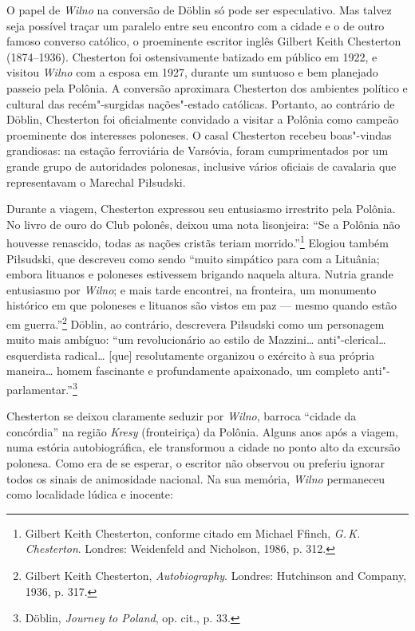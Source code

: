 %

O papel de \textit{Wilno} na conversão de Döblin só pode ser especulativo. Mas
talvez seja possível traçar um paralelo entre seu encontro com a cidade
e o de outro famoso converso católico, o proeminente escritor inglês
Gilbert Keith Chesterton (1874--1936). Chesterton foi ostensivamente
batizado em público em 1922, e visitou \textit{Wilno} com a esposa em 1927,
durante um suntuoso e bem planejado passeio pela Polônia. A conversão
aproximara Chesterton dos ambientes político e cultural das
recém"-surgidas nações"-estado católicas. Portanto, ao contrário de
Döblin, Chesterton foi oficialmente convidado a visitar a Polônia como
campeão proeminente dos interesses poloneses. O casal Chesterton recebeu
boas"-vindas grandiosas: na estação ferroviária de Varsóvia, foram
cumprimentados por um grande grupo de autoridades polonesas, inclusive
vários oficiais de cavalaria que representavam o Marechal Piłsudski.

Durante a viagem, Chesterton expressou seu entusiasmo irrestrito pela
Polônia. No livro de ouro do  Club polonês, deixou uma nota
lisonjeira: ``Se a Polônia não houvesse renascido, todas as nações
cristãs teriam morrido.''\footnote{Gilbert Keith Chesterton, conforme citado em Michael Ffinch, \textit{G.\,K. Chesterton}. Londres: Weidenfeld and Nicholson, 1986, p. 312.} Elogiou também Piłsudski, que descreveu como sendo ``muito simpático para com a Lituânia; embora lituanos e
poloneses estivessem brigando naquela altura. Nutria grande entusiasmo
por \textit{Wilno}; e mais tarde encontrei, na fronteira, um monumento histórico
em que poloneses e lituanos são vistos em paz --- mesmo quando estão em
guerra.''\footnote{Gilbert Keith Chesterton, \textit{Autobiography}. Londres: Hutchinson and Company, 1936, p. 317.} Döblin, ao contrário, descrevera Piłsudski como um personagem muito mais ambíguo: ``um
revolucionário ao estilo de Mazzini\ldots{} anti"-clerical\ldots{}
esquerdista radical\ldots{} {[}que{]} resolutamente organizou o exército
à sua própria maneira\ldots{} homem fascinante e profundamente
apaixonado, um completo anti"-parlamentar.''\footnote{Döblin, \textit{Journey to Poland}, op. cit., p. 33.}

Chesterton se deixou claramente seduzir por \textit{Wilno}, barroca ``cidade da
concórdia'' na região \textit{Kresy} (fronteiriça) da Polônia. Alguns anos
após a viagem, numa estória autobiográfica, ele transformou a cidade no
ponto alto da excursão polonesa. Como era de se esperar, o escritor não
observou ou preferiu ignorar todos os sinais de animosidade nacional. Na
sua memória, \textit{Wilno} permaneceu como localidade lúdica e inocente:


